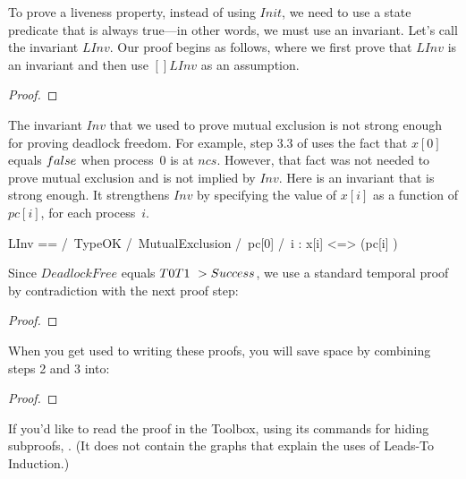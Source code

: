 \documentclass[fleqn,leqno]{article}
\begin{document}
To prove a liveness property, instead of using $Init$, we need to use
a state predicate that is always true---in other words, we must use an
invariant.  Let's call the invariant $LInv$.  Our proof begins as
follows, where we first prove that $LInv$ is an invariant and then use
$[]LInv$ as an assumption.
\begin{display}
\pflongnumbers
\interStepSpace{.5em}
\begin{proof}

\end{proof}
\end{display}
The invariant $Inv$ that we used to prove mutual exclusion is not
strong enough for proving deadlock freedom.  For example, step 3.3 of
 uses the fact that $x[0]$ equals
$\FALSE$ when process~0 is at $ncs$.  However, that fact was not
needed to prove mutual exclusion and is not implied by $Inv$.  Here is
an invariant that is strong enough.  It strengthens $Inv$ by
specifying the value of $x[i]$ as a function of
$pc[i]$, for each process~$i$.
\begin{display}
\begin{notla}
LInv == /\ TypeOK
        /\ {MutualExclusion}
        /\ pc[0] 
        /\ \A i  : x[i] <=> (pc[i] )
\end{notla}
\begin{tlatex}
%
%
%
\end{tlatex}
\end{display}
Since $DeadlockFree$ equals $T0 \/ T1 ~> Success$, we use a standard
temporal proof by contradiction with the next proof step:
\begin{display}
\pflongnumbers
\begin{proof}
 
\end{proof}
\end{display}
When you get used to writing these proofs, you will save space by combining
steps 2 and 3 into:
\begin{display}
\pflongnumbers
\begin{proof}
\end{proof}
\end{display}
If you'd like to read the proof in the Toolbox, using its commands for
hiding subproofs, .  (It does not contain the graphs that
explain the uses of Leads-To Induction.)
\end{document}
